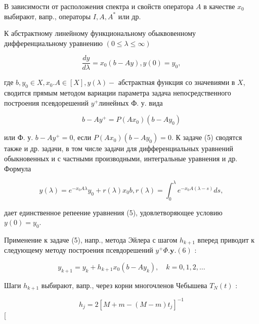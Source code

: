 \documentclass[10pt]{article}
\begin{document}
В зависимости от расположения спектра и свойств оператора $A$ в качестве $x_{0}$ выбирают, вапр., операторы $I, A, A^{*}$ или др.



К абстрактному линейному функциональному обыквовенному дифференциальному уравнению $(0 \leqslant \lambda \leqslant \infty)$



\[

\frac{d y}{d \lambda}=x_{0}(b-A y), y(0)=y_{0},

\]



где $b, y_{0} \in X, x_{0} . A \in[X], y(\lambda)-$ абстрактная функция со значевиями в $X$, сводится прямым методом вариации параметра задача непосредственного построения псевдорешений $y^{+}$линейных Ф. у. вида



\[

b-A y^{+}=P\left(A x_{0}\right)\left(b-A y_{0}\right)

\]



или Ф. у. $b-A y^{+}=0$, если $P\left(A x_{0}\right)\left(b-A y_{0}\right)=0$. К задаче (5) сводятся также и др. задачи, в том числе задачи для дифференциальных уравнений обыкновенных и с частными производными, интегральные уравнения и др. Формула



\[

y(\lambda)=e^{-x_{0} A \lambda} y_{0}+r(\lambda) x_{0} b, r(\lambda)=\int_{0}^{\lambda} e^{-x_{0} A(\lambda-s)} d s,

\]



дает единственное репеение уравнения (5), удовлетворяющее условию $y(0)=y_{0}$.



Применение к задаче (5), напр., метода Эйлера с шагом $h_{k+1}$ вперед приводит к следующему методу построения псевдорешений $y^{+} \Phi . \mathbf{y} .(6)$ :



\[

y_{k+1}=y_{k}+h_{k+1} x_{0}\left(b-A y_{k}\right), \quad k=0,1,2, \ldots

\]



Шаги $h_{k+1}$ выбирают, вапр., через корни многочленов Чебышева $T_{N}(t)$ :



\[

h_{j}=2\left[M+m-(M-m) t_{j}\right]^{-1}

\][
\end{document}
